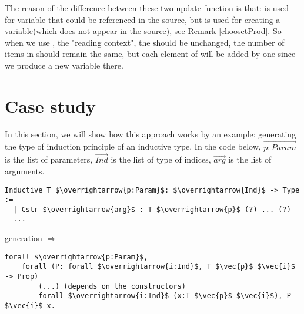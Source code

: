\documentclass[a4paper,UKenglish,cleveref, autoref, thm-restate]{lipics-v2021}
\begin{document}
The reason of the difference between these two update function is that:  is used for variable that could be referenced in the source, but  is used for creating a variable(which does not appear in the source), see Remark \ref{choosetProd}. So when we use , the "reading context", the  should be unchanged, the number of items in  should remain the same, but each element of  will be added by one since we produce a new variable there.

\section{Case study}


In this section, we will show how this approach works by an example: generating the type of induction principle of an inductive type. In the code below, $\overrightarrow{p:Param}$ is the list of parameters, $\overrightarrow{Ind}$ is the list of type of indices, $\overrightarrow{arg}$ is the list of arguments. 

\begin{lstlisting}[language = {Coq}, basicstyle = \small]
Inductive T $\overrightarrow{p:Param}$: $\overrightarrow{Ind}$ -> Type :=
  | Cstr $\overrightarrow{arg}$ : T $\overrightarrow{p}$ (?) ... (?)
  ...
\end{lstlisting}


generation $\Longrightarrow$

\begin{lstlisting}[language = {Coq}, basicstyle = \small]
forall $\overrightarrow{p:Param}$,
    forall (P: forall $\overrightarrow{i:Ind}$, T $\vec{p}$ $\vec{i}$ -> Prop)
        (...) (depends on the constructors)
        forall $\overrightarrow{i:Ind}$ (x:T $\vec{p}$ $\vec{i}$), P $\vec{i}$ x.
\end{lstlisting}

\end{document}
